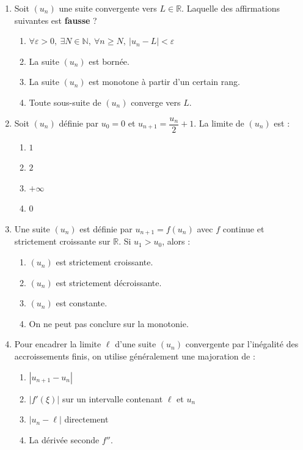 \documentclass[11pt]{article}
\begin{document}
\begin{exercice}
\begin{enumerate}
    \item Soit $(u_n)$ une suite convergente vers $L \in \mathbb{R}$. Laquelle des affirmations suivantes est \textbf{fausse} ?
    \begin{enumerate}
        \item $\forall \varepsilon > 0,\ \exists N \in \mathbb{N},\ \forall n \geq N,\ |u_n - L| < \varepsilon$
        \item La suite $(u_n)$ est bornée.
        \item La suite $(u_n)$ est monotone à partir d'un certain rang.
        \item Toute sous-suite de $(u_n)$ converge vers $L$.
    \end{enumerate}
    \item Soit $(u_n)$ définie par $u_0 = 0$ et $u_{n+1} = \dfrac{u_n}{2} + 1$. La limite de $(u_n)$ est :
    \begin{enumerate}
        \item $1$ \item $2$ \item $+\infty$ \item $0$
    \end{enumerate}
    \item Une suite $(u_n)$ est définie par $u_{n+1} = f(u_n)$ avec $f$ continue et strictement croissante sur $\mathbb{R}$. Si $u_1 > u_0$, alors :
    \begin{enumerate}
        \item $(u_n)$ est strictement croissante.
        \item $(u_n)$ est strictement décroissante.
        \item $(u_n)$ est constante.
        \item On ne peut pas conclure sur la monotonie.
    \end{enumerate}
    \item Pour encadrer la limite $\ell$ d'une suite $(u_n)$ convergente par l'inégalité des accroissements finis, on utilise généralement une majoration de :
    \begin{enumerate}
        \item $|u_{n+1} - u_n|$ \item $|f'(\xi)|$ sur un intervalle contenant $\ell$ et $u_n$
        \item $|u_n - \ell|$ directement \item La dérivée seconde $f''$.
    \end{enumerate}
\end{enumerate}
\end{exercice}
\end{document}
